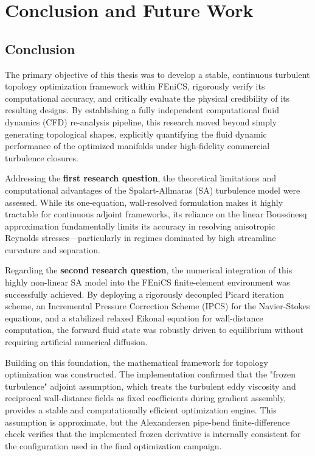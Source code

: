\chapter{Conclusion and Future Work}
\label{ch:conclusion}

\section{Conclusion}
The primary objective of this thesis was to develop a stable, continuous turbulent topology optimization framework within FEniCS, rigorously verify its computational accuracy, and critically evaluate the physical credibility of its resulting designs. By establishing a fully independent computational fluid dynamics (CFD) re-analysis pipeline, this research moved beyond simply generating topological shapes, explicitly quantifying the fluid dynamic performance of the optimized manifolds under high-fidelity commercial turbulence closures.

Addressing the \textbf{first research question}, the theoretical limitations and computational advantages of the Spalart-Allmaras (SA) turbulence model were assessed. While its one-equation, wall-resolved formulation makes it highly tractable for continuous adjoint frameworks, its reliance on the linear Boussinesq approximation fundamentally limits its accuracy in resolving anisotropic Reynolds stresses—particularly in regimes dominated by high streamline curvature and separation. 

Regarding the \textbf{second research question}, the numerical integration of this highly non-linear SA model into the FEniCS finite-element environment was successfully achieved. By deploying a rigorously decoupled Picard iteration scheme, an Incremental Pressure Correction Scheme (IPCS) for the Navier-Stokes equations, and a stabilized relaxed Eikonal equation for wall-distance computation, the forward fluid state was robustly driven to equilibrium without requiring artificial numerical diffusion.

Building on this foundation, the mathematical framework for topology optimization was constructed. The implementation confirmed that the "frozen turbulence" adjoint assumption, which treats the turbulent eddy viscosity and reciprocal wall-distance fields as fixed coefficients during gradient assembly, provides a stable and computationally efficient optimization engine. This assumption is approximate, but the Alexandersen pipe-bend finite-difference check verifies that the implemented frozen derivative is internally consistent for the configuration used in the final optimization campaign.

